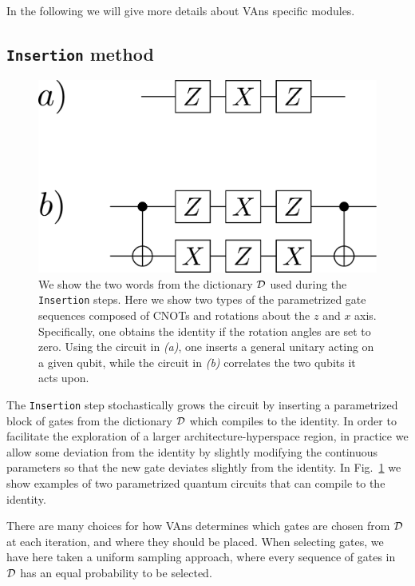 In the following we will give more details about VAns specific modules.
\subsection{\texttt{Insertion} method}\label{ssec:insertion}
\begin{figure}[t]
\centering
\includegraphics[width=.5\textwidth]{Figures/VANS/Fig3.pdf}
\caption{We show the two words from the dictionary $\mathcal{D}$ used during the \texttt{Insertion} steps. Here we show two types of the parametrized gate sequences composed of CNOTs and rotations about the $z$ and $x$ axis. Specifically, one obtains the identity if the rotation angles are set to zero. Using the circuit in \textit{(a)}, one inserts a general unitary acting on a given qubit, while the circuit in \textit{(b)} correlates the two qubits it acts upon.}
\label{fig:blocks}
\end{figure}

The \texttt{Insertion} step stochastically grows the circuit by inserting a parametrized block of gates from the dictionary $\mathcal{D}$ which compiles to the identity. In order to facilitate the exploration of a larger architecture-hyperspace region, in practice we allow some deviation from the identity by slightly modifying the continuous parameters so that the new gate deviates slightly from the identity. In Fig.~\ref{fig:blocks} we show examples of two parametrized quantum circuits that can compile to the identity.

There are many choices for how VAns determines which gates are chosen from $\mathcal{D}$ at each iteration, and where they should be placed. When selecting gates, we have here taken a uniform sampling approach, where every sequence of gates in $\mathcal{D}$ has an equal probability to be selected.

